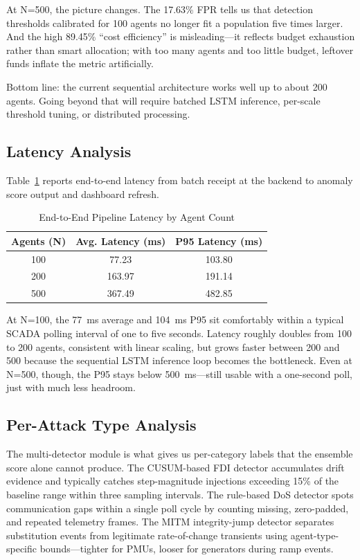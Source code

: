 \documentclass[conference]{IEEEtran}
\begin{document}
At N=500, the picture changes. The 17.63\% FPR tells us that detection thresholds calibrated for 100 agents no longer fit a population five times larger. And the high 89.45\% ``cost efficiency'' is misleading---it reflects budget exhaustion rather than smart allocation; with too many agents and too little budget, leftover funds inflate the metric artificially.

Bottom line: the current sequential architecture works well up to about 200 agents. Going beyond that will require batched LSTM inference, per-scale threshold tuning, or distributed processing.

\subsection{Latency Analysis}

Table~\ref{tab:latency} reports end-to-end latency from batch receipt at the backend to anomaly score output and dashboard refresh.

\begin{table}[htbp]
\caption{End-to-End Pipeline Latency by Agent Count}
\begin{center}
\begin{tabular}{|c|c|c|}
\hline
\textbf{Agents (N)} & \textbf{Avg. Latency (ms)} & \textbf{P95 Latency (ms)} \\
\hline
100 & 77.23 & 103.80 \\
\hline
200 & 163.97 & 191.14 \\
\hline
500 & 367.49 & 482.85 \\
\hline
\end{tabular}
\label{tab:latency}
\end{center}
\end{table}

At N=100, the 77~ms average and 104~ms P95 sit comfortably within a typical SCADA polling interval of one to five seconds. Latency roughly doubles from 100 to 200 agents, consistent with linear scaling, but grows faster between 200 and 500 because the sequential LSTM inference loop becomes the bottleneck. Even at N=500, though, the P95 stays below 500~ms---still usable with a one-second poll, just with much less headroom.

\subsection{Per-Attack Type Analysis}

The multi-detector module is what gives us per-category labels that the ensemble score alone cannot produce. The CUSUM-based FDI detector accumulates drift evidence and typically catches step-magnitude injections exceeding 15\% of the baseline range within three sampling intervals. The rule-based DoS detector spots communication gaps within a single poll cycle by counting missing, zero-padded, and repeated telemetry frames. The MITM integrity-jump detector separates substitution events from legitimate rate-of-change transients using agent-type-specific bounds---tighter for PMUs, looser for generators during ramp events.
\end{document}
